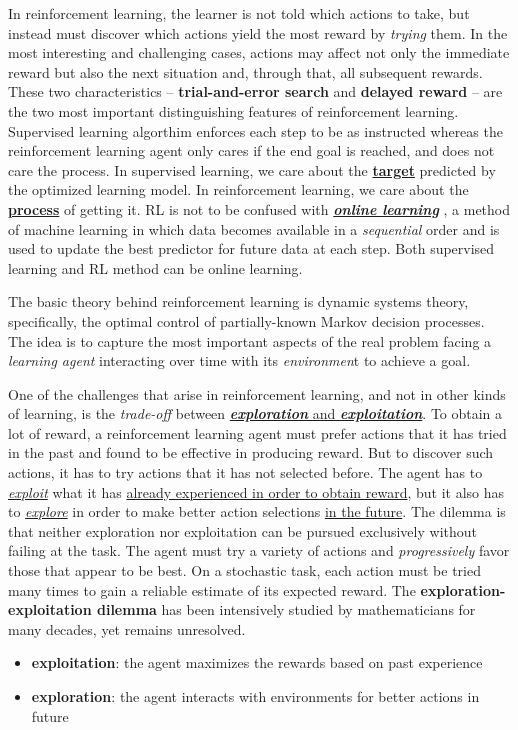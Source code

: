 \documentclass[11pt]{article}
\begin{document}
In reinforcement learning, the learner is not told which actions to take, but instead must discover which actions yield the most reward by \emph{trying} them. In the most interesting and challenging cases, actions may affect not only the immediate reward but also the next situation and, through that, all subsequent rewards. These two characteristics -- \textbf{trial-and-error search} and \textbf{delayed reward} -- are the two most important distinguishing features of reinforcement learning. Supervised learning algorthim enforces each step to be as instructed whereas the reinforcement learning agent only cares if the end goal is reached, and does not care the process. In supervised learning, we care about the \underline{\textbf{target}} predicted by the optimized learning model. In reinforcement learning, we care about the \underline{\textbf{process}} of getting it. RL is not to be confused with \underline{\textbf{\emph{online learning}}} \citep{cesa2006prediction, shalev2012online}, a method of machine learning in which data becomes available in a \emph{sequential} order and is used to update the best predictor for future data at each step. Both supervised learning and RL method can be online learning.

 
The basic theory behind reinforcement learning is dynamic systems theory, specifically, the optimal control of partially-known Markov decision processes. The idea is to capture the most important aspects of the real problem facing a \emph{learning agent} interacting over time with its \emph{environmen}t to achieve a goal. 

One of the challenges that arise in reinforcement learning, and not in other kinds of learning, is the \emph{trade-off} between  \underline{\emph{\textbf{exploration}} and \emph{\textbf{exploitation}}}. To obtain a lot of reward, a reinforcement learning agent must prefer actions that it has tried in the past and found to be effective in producing reward. But to discover such actions, it has to try actions that it has not selected before. The agent has to  \underline{\emph{exploit}} what it has \underline{already experienced in order to obtain reward}, but it also has to \underline{\emph{explore}} in order to make better action selections \underline{in the future}. The dilemma is that neither exploration nor exploitation can be pursued exclusively without failing at the task. The agent must try a variety of actions and \emph{progressively} favor those that appear to be best. On a stochastic task, each action must be tried many times to gain a reliable estimate of its expected reward. The \textbf{exploration-exploitation dilemma} has been intensively studied by mathematicians for many decades, yet remains unresolved.
\begin{itemize}
\item \textbf{exploitation}: the agent maximizes the rewards based on past experience

\item \textbf{exploration}: the agent interacts with environments for better actions in future
\end{itemize}
\end{document}
